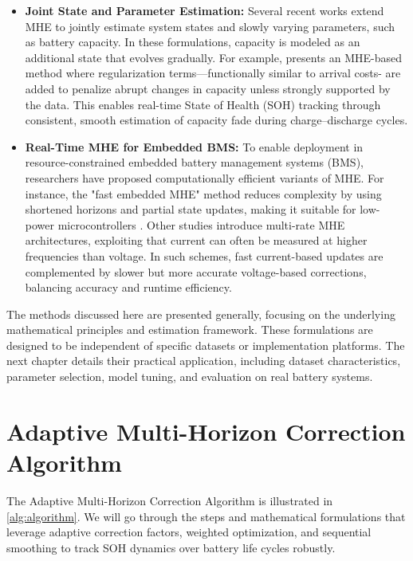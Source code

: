 \begin{itemize}
    \item \textbf{Joint State and Parameter Estimation:}  
    Several recent works extend MHE to jointly estimate system states and slowly varying parameters, such as battery capacity. In these formulations, capacity is modeled as an additional state that evolves gradually. For example, \cite{Yongzhe} presents an MHE-based method where regularization terms—functionally similar to arrival costs- are added to penalize abrupt changes in capacity unless strongly supported by the data. This enables real-time State of Health (SOH) tracking through consistent, smooth estimation of capacity fade during charge–discharge cycles.

    \item \textbf{Real-Time MHE for Embedded BMS:}  
    To enable deployment in resource-constrained embedded battery management systems (BMS), researchers have proposed computationally efficient variants of MHE. For instance, the "fast embedded MHE" method reduces complexity by using shortened horizons and partial state updates, making it suitable for low-power microcontrollers \cite{wan2024towards}. Other studies introduce multi-rate MHE architectures, exploiting that current can often be measured at higher frequencies than voltage. In such schemes, fast current-based updates are complemented by slower but more accurate voltage-based corrections, balancing accuracy and runtime efficiency.
\end{itemize}

The methods discussed here are presented generally, focusing on the underlying mathematical principles and estimation framework. These formulations are designed to be independent of specific datasets or implementation platforms. The next chapter details their practical application, including dataset characteristics, parameter selection, model tuning, and evaluation on real battery systems.


\section{Adaptive Multi-Horizon Correction Algorithm}
\label{algo}
The Adaptive Multi-Horizon Correction Algorithm is illustrated in \ref{alg:algorithm}. We will go through the steps and mathematical formulations that leverage adaptive correction factors, weighted optimization, and sequential smoothing to track SOH dynamics over battery life cycles robustly. 

